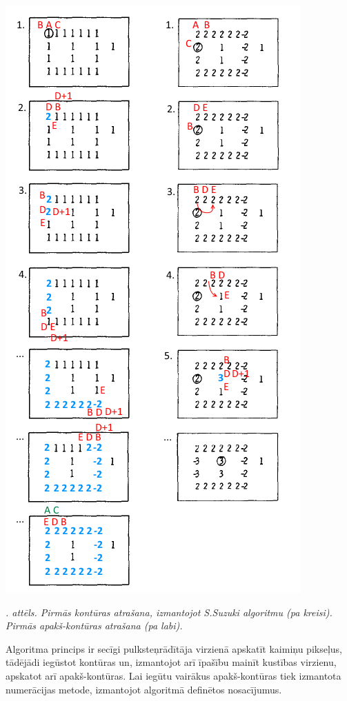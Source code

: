 \documentclass[12pt, a4paper, oneside, openright]{article}
\renewcommand{\thecimages}{\arabic{cimages}}
\begin{document}
\label{cimages:contour_algo}
\vspace{10pt}
\begin{samepage}
\begin{center}
\includegraphics[height=0.95\columnwidth]{images/contour_algo.png}
\begin{center}
\footnotesize{
\textit{\thecimages. attēls. Pirmās kontūras atrašana, izmantojot S.Suzuki algoritmu (pa kreisi). Pirmās apakš-kontūras atrašana (pa labi).}}
\end{center}
\end{center}
\end{samepage}

Algoritma princips ir secīgi pulksteņrādītāja virzienā apskatīt kaimiņu pikseļus, tādējādi
iegūstot kontūras un, izmantojot arī īpašību mainīt kustības virzienu, apskatot arī apakš-kontūras.
Lai iegūtu vairākus apakš-kontūras tiek izmantota numerācijas metode, izmantojot algoritmā definētos nosacījumus.
\end{document}

